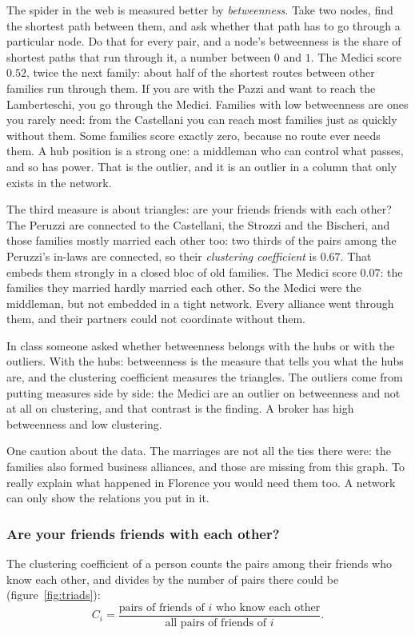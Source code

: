 \documentclass[12pt, a4paper]{article}
\theoremstyle{definition}
\theoremstyle{remark}
\begin{document}
The spider in the web is measured better by \emph{betweenness}. Take two nodes, find the shortest path between them, and ask whether that path has to go through a particular node. Do that for every pair, and a node's betweenness is the share of shortest paths that run through it, a number between $0$ and $1$. The Medici score $0.52$, twice the next family: about half of the shortest routes between other families run through them. If you are with the Pazzi and want to reach the Lamberteschi, you go through the Medici. Families with low betweenness are ones you rarely need: from the Castellani you can reach most families just as quickly without them. Some families score exactly zero, because no route ever needs them. A hub position is a strong one: a middleman who can control what passes, and so has power. That is the outlier, and it is an outlier in a column that only exists in the network.

The third measure is about triangles: are your friends friends with each other? The Peruzzi are connected to the Castellani, the Strozzi and the Bischeri, and those families mostly married each other too: two thirds of the pairs among the Peruzzi's in-laws are connected, so their \emph{clustering coefficient} is $0.67$. That embeds them strongly in a closed bloc of old families. The Medici score $0.07$: the families they married hardly married each other. So the Medici were the middleman, but not embedded in a tight network. Every alliance went through them, and their partners could not coordinate without them.

In class someone asked whether betweenness belongs with the hubs or with the outliers. With the hubs: betweenness is the measure that tells you what the hubs are, and the clustering coefficient measures the triangles. The outliers come from putting measures side by side: the Medici are an outlier on betweenness and not at all on clustering, and that contrast is the finding. A broker has high betweenness and low clustering.

One caution about the data. The marriages are not all the ties there were: the families also formed business alliances, and those are missing from this graph. To really explain what happened in Florence you would need them too. A network can only show the relations you put in it.

\subsubsection{Are your friends friends with each other?}
The clustering coefficient of a person counts the pairs among their friends who know each other, and divides by the number of pairs there could be (figure~\ref{fig:triads}):
\[
C_i = \frac{\text{pairs of friends of } i \text{ who know each other}}{\text{all pairs of friends of } i}.
\]
\end{document}
